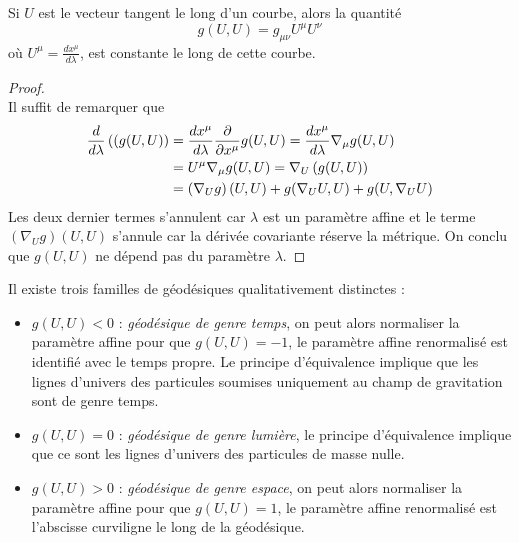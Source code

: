 \documentclass[a4paper,11pt]{report}
\begin{document}
            \begin{prop}\begin{leftbar}
                Si $U$ est le vecteur tangent le long d'un courbe, alors la quantité
                \begin{equation}
                    g(U,U) = g_{\mu\nu}U^\mu U^\nu
                \end{equation}
                où $U^\mu = \frac{dx^\mu}{d\lambda}$, est constante le long de cette courbe.
            \end{leftbar}\end{prop}
            
            \begin{proof}${}$\\
                Il suffit de remarquer que
                \begin{align}
                    \frac{d}{d\lambda}\left((g(U,U)\right) &= \frac{dx^\mu}{d\lambda}\pdv{}{x^\mu} g(U,U) = \frac{dx^\mu}{d\lambda}\nabla_\mu g(U,U)\\ 
                    &= U^\mu \nabla_\mu g(U,U) = \nabla_U\left(g(U,U)\right) \\
                    &= \left(\nabla_Ug\right)(U,U) + g(\nabla_U U,U) + g(U,\nabla_U U) 
                \end{align}
                Les deux dernier termes s'annulent car $\lambda$ est un paramètre affine et le terme $\left(\nabla_Ug\right)(U,U)$ s'annule car la dérivée covariante réserve la métrique. On conclu que $g(U,U)$ ne dépend pas du paramètre $\lambda$.
            \end{proof}
            
            \begin{definition}
                Il existe trois familles de géodésiques qualitativement distinctes :
                \begin{itemize}[label = \textbullet]
                    \item $g(U,U)<0$ : \textit{géodésique de genre temps}, on peut alors normaliser la paramètre affine pour que $g(U,U) = -1$, le paramètre affine renormalisé est identifié avec le temps propre. Le principe d'équivalence implique que les lignes d'univers des particules soumises uniquement au champ de gravitation sont de genre temps.
                    \item $g(U,U)=0$ : \textit{géodésique de genre lumière}, le principe d'équivalence implique que ce sont les lignes d'univers des particules de masse nulle.
                    \item $g(U,U)>0$ : \textit{géodésique de genre espace}, on peut alors normaliser la paramètre affine pour que $g(U,U) = 1$, le paramètre affine renormalisé est l'abscisse curviligne le long de la géodésique.
                \end{itemize}
            \end{definition}
            
\end{document}
